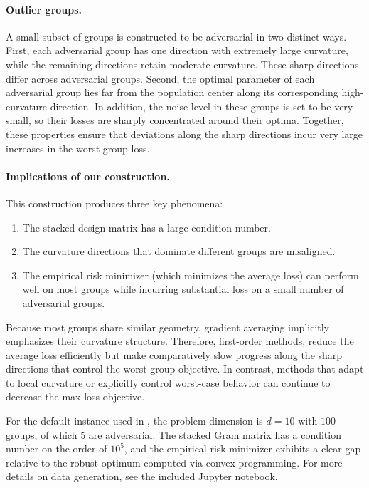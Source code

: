 \paragraph{Outlier groups.}
A small subset of groups is constructed to be adversarial in two distinct ways. First, each adversarial group has one direction with extremely large curvature, while the remaining directions retain moderate curvature. These sharp directions differ across adversarial groups. Second, the optimal parameter of each adversarial group lies far from the population center along its corresponding high-curvature direction. In addition, the noise level in these groups is set to be very small, so their losses are sharply concentrated around their optima. Together, these properties ensure that deviations along the sharp directions incur very large increases in the worst-group loss.

\paragraph{Implications of our construction.}
This construction produces three key phenomena:

\begin{enumerate}
    \item The stacked design matrix has a large condition number.
    \item The curvature directions that dominate different groups are misaligned.
    \item The empirical risk minimizer (which minimizes the average loss) can perform well on most groups while incurring substantial loss on a small number of adversarial groups.
\end{enumerate}

Because most groups share similar geometry, gradient averaging implicitly emphasizes their curvature structure. Therefore, first-order methods, reduce the average loss efficiently but make comparatively slow progress along the sharp directions that control the worst-group objective. In contrast, methods that adapt to local curvature or explicitly control worst-case behavior can continue to decrease the max-loss objective.

For the default instance used in , the problem dimension is $d=10$ with $100$ groups, of which $5$ are adversarial. The stacked Gram matrix has a condition number on the order of $10^5$, and the empirical risk minimizer exhibits a clear gap relative to the robust optimum computed via convex programming. For more details on data generation, see the included Jupyter notebook.


